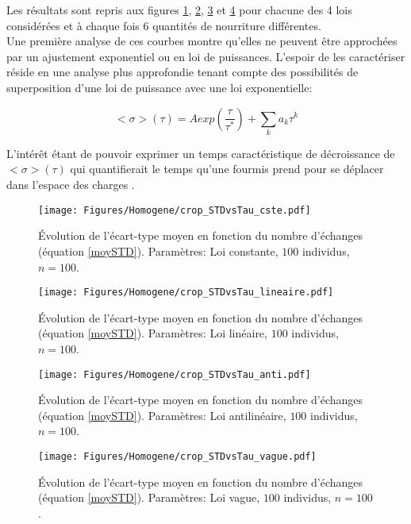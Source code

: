 Les résultats sont repris aux figures \ref{ergo_cste_STD}, \ref{ergo_lineaire_STD}, \ref{ergo_anti_STD} et \ref{ergo_vague_STD} pour chacune des 4 lois considérées et à chaque fois 6 quantités de nourriture différentes.\\


Une première analyse de ces courbes montre qu'elles ne peuvent être approchées par un ajustement exponentiel ou en loi de puissances. L'espoir de les caractériser réside en une analyse plus approfondie tenant compte des possibilités de superposition d'une loi de puissance avec une loi exponentielle:

\begin{equation}
<\sigma>(\tau)=A exp(\frac{\tau}{\tau^*}) + \sum_k a_k \tau^k
\end{equation}

L'intérêt étant de pouvoir exprimer un temps caractéristique de décroissance de $<\sigma>(\tau)$ qui quantifierait le temps qu'une fourmis prend pour se déplacer dans l'espace des charges .\\

\begin{figure}[h]
\centering
\texttt{[image: Figures/Homogene/crop\_STDvsTau\_cste.pdf]}
\caption{Évolution de l'écart-type moyen en fonction du nombre d'échanges (équation \ref{moySTD}). Paramètres: Loi constante, $100$ individus, $n=100$.}
\label{ergo_cste_STD}
\end{figure}

\begin{figure}[h]
\centering
\texttt{[image: Figures/Homogene/crop\_STDvsTau\_lineaire.pdf]}
\caption{Évolution de l'écart-type moyen en fonction du nombre d'échanges (équation \ref{moySTD}). Paramètres: Loi linéaire, $100$ individus, $n=100$.}
\label{ergo_lineaire_STD}
\end{figure}

\begin{figure}[h]
\centering
\texttt{[image: Figures/Homogene/crop\_STDvsTau\_anti.pdf]}
\caption{Évolution de l'écart-type moyen en fonction du nombre d'échanges (équation \ref{moySTD}). Paramètres: Loi antilinéaire, $100$ individus, $n=100$.}
\label{ergo_anti_STD}
\end{figure}

\begin{figure}[h]
\centering
\texttt{[image: Figures/Homogene/crop\_STDvsTau\_vague.pdf]}
\caption{Évolution de l'écart-type moyen en fonction du nombre d'échanges (équation \ref{moySTD}). Paramètres: Loi vague, $100$ individus, $n=100$.}
\label{ergo_vague_STD}
\end{figure}

